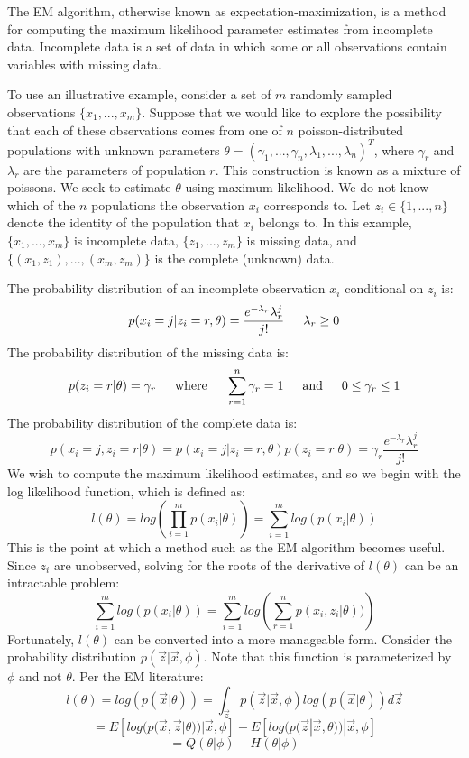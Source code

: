 \documentclass[letter,12pt]{article}
\begin{document}
The EM algorithm, otherwise known as expectation-maximization, is a method for computing the maximum likelihood parameter estimates from incomplete data.  Incomplete data is a set of data in which some or all observations contain variables with missing data.  

To use an illustrative example, consider a set of $m$ randomly sampled observations $\{x_1,...,x_m\}$.  Suppose that we would like to explore the possibility that each of these observations comes from one of $n$ poisson-distributed populations with unknown parameters $\theta=(\gamma_1,...,\gamma_n,\lambda_1,...,\lambda_n)^T$, where $\gamma_r$ and $\lambda_r$ are the parameters of population $r$.  This construction is known as a mixture of poissons.  We seek to estimate $\theta$ using maximum likelihood.  We do not know which of the $n$ populations the observation $x_i$ corresponds to.  Let $z_i \in \{1,...,n\}$ denote the identity of the population that $x_i$ belongs to.  In this example, $\{x_1,...,x_m\}$ is incomplete data, $\{z_1,...,z_m\}$ is missing data, and $\{(x_1,z_1),...,(x_m,z_m)\}$ is the complete (unknown) data.

The probability distribution of an incomplete observation $x_i$ conditional on $z_i$ is:
\[
p(x_i=j|z_i=r,\theta) = \frac{e^{-\lambda_r}\lambda_r^{j}}{j!}  
\indent
\lambda_r \geq 0
\]
The probability distribution of the missing data is:
\[
p(z_i=r|\theta) = \gamma_r
\indent
\text{where}
\indent 
\sum_{r=1}^{n}\gamma_r = 1
\indent
\text{and}
\indent 
0 \leq \gamma_r \leq 1
\]
The probability distribution of the complete data is:
\begin{equation} \label{eq_constraint}
p(x_i=j,z_i=r|\theta) 
= p(x_i=j|z_i=r,\theta)p(z_i=r|\theta) = \gamma_r\frac{e^{-\lambda_r}\lambda_r^{j}}{j!}
\end{equation}
We wish to compute the maximum likelihood estimates, and so we begin with the log likelihood function, which is defined as:
\[
l(\theta) = log(\prod_{i=1}^{m}p(x_i|\theta)) = \sum_{i=1}^{m} log(p(x_i|\theta))
\]
This is the point at which a method such as the EM algorithm becomes useful.  Since $z_i$ are unobserved, solving for the roots of the derivative of $l(\theta)$ can be an intractable problem:
\[
\sum_{i=1}^{m} log(p(x_i|\theta)) = \sum_{i=1}^{m} log\left(\sum_{r=1}^{n}p(x_i,z_i|\theta))\right)
\]
Fortunately, $l(\theta)$ can be converted into a more manageable form.  Consider the probability distribution $p(\vec{z}|\vec{x},\phi)$.  Note that this function is parameterized by $\phi$ and not $\theta$.  Per the EM literature:
\[
l(\theta) = log(p(\vec{x}|\theta)) 
= \int_{\vec{z}}p(\vec{z}|\vec{x},\phi)log(p(\vec{x}|\theta))d\vec{z}
\]
\[
=
E[log(p(\vec{x},\vec{z}|\theta))|\vec{x},\phi]
-
E[log(p(\vec{z}|\vec{x},\theta))|\vec{x},\phi]
\]
\begin{equation} \label{eq:QH}
=Q(\theta|\phi)
-H(\theta|\phi)
\end{equation}
\end{document}
